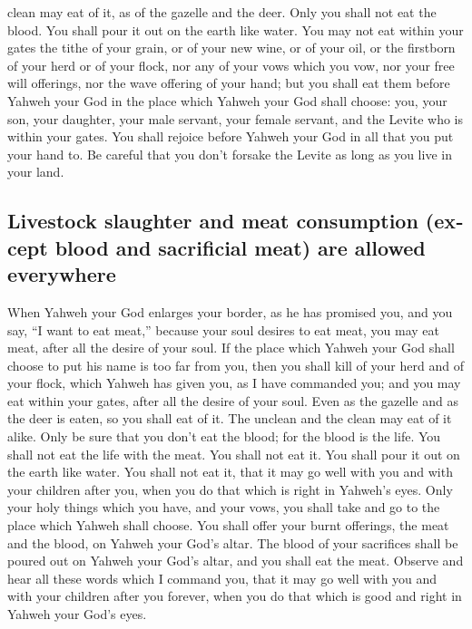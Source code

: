 \begin{paracol}{2}
\begin{otherlanguage}{english}
clean may eat of it, as of the gazelle and the deer. 
Only you shall not eat the blood. You shall pour it out on the earth
like water.  You may not eat within your gates the tithe
of your grain, or of your new wine, or of your oil, or the firstborn of
your herd or of your flock, nor any of your vows which you vow, nor your
free will offerings, nor the wave offering of your hand; 
but you shall eat them before Yahweh your God in the place which Yahweh
your God shall choose: you, your son, your daughter, your male servant,
your female servant, and the Levite who is within your gates. You shall
rejoice before Yahweh your God in all that you put your hand to.
 Be careful that you don't forsake the Levite as long as
you live in your land.

\hypertarget{livestock-slaughter-and-meat-consumption-except-blood-and-sacrificial-meat-are-allowed-everywhere}{%
\subsection{Livestock slaughter and meat consumption (except blood and
sacrificial meat) are allowed
everywhere}\label{livestock-slaughter-and-meat-consumption-except-blood-and-sacrificial-meat-are-allowed-everywhere}}

 When Yahweh your God enlarges your border, as he has
promised you, and you say, ``I want to eat meat,'' because your soul
desires to eat meat, you may eat meat, after all the desire of your
soul.  If the place which Yahweh your God shall choose to
put his name is too far from you, then you shall kill of your herd and
of your flock, which Yahweh has given you, as I have commanded you; and
you may eat within your gates, after all the desire of your soul.
 Even as the gazelle and as the deer is eaten, so you
shall eat of it. The unclean and the clean may eat of it alike.
 Only be sure that you don't eat the blood; for the blood
is the life. You shall not eat the life with the meat. 
You shall not eat it. You shall pour it out on the earth like water.
 You shall not eat it, that it may go well with you and
with your children after you, when you do that which is right in
Yahweh's eyes.  Only your holy things which you have, and
your vows, you shall take and go to the place which Yahweh shall choose.
 You shall offer your burnt offerings, the meat and the
blood, on Yahweh your God's altar. The blood of your sacrifices shall be
poured out on Yahweh your God's altar, and you shall eat the meat.
 Observe and hear all these words which I command you,
that it may go well with you and with your children after you forever,
when you do that which is good and right in Yahweh your God's eyes.


\end{otherlanguage}
\end{paracol}
